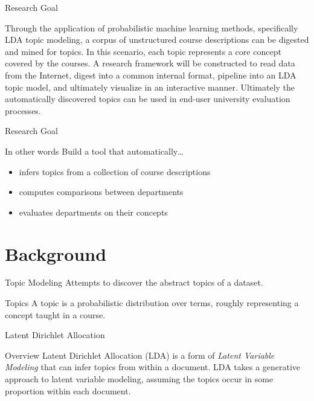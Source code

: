 \documentclass[10pt, compress]{beamer}
\begin{document}
\begin{frame}{Research Goal}

  \vfill
  Through the application of probabilistic machine learning methods,
  specifically LDA topic modeling, a corpus of unstructured course
  descriptions can be digested and mined for topics. In this scenario,
  each topic represents a core concept covered by the courses.
  \vfill
  A research framework will be constructed to read data from the
  Internet, digest into a common internal format, pipeline into an LDA
  topic model, and ultimately visualize in an interactive manner.
  \vfill
  Ultimately the automatically discovered topics can be used in end-user
  university evaluation processes.
  \vfill
\end{frame}


\begin{frame}{Research Goal}

  \begin{block}{In other words}
    Build a tool that automatically\ldots
    \onslide<+->
    \begin{itemize}[<+- | alert@+>]
      \item infers topics from a collection of course descriptions
      \item computes comparisons between departments
      \item evaluates departments on their concepts
    \end{itemize}
  \end{block}

\end{frame}


\section{Background}


\begin{frame}{Topic Modeling}
  Attempts to discover the abstract \alert{topics} of a dataset.

  \begin{block}{Topics}
    A \alert{topic} is a probabilistic distribution over terms, roughly
    representing a concept taught in a course.
  \end{block}
\end{frame}


\begin{frame}{Latent Dirichlet Allocation}
  \begin{block}{Overview}
    \alert{Latent Dirichlet Allocation (LDA)} is a form of \emph{Latent
    Variable Modeling} that can infer topics from within a document.
    \vfill
    LDA takes a generative approach to latent variable modeling, assuming
    the topics occur in some proportion within each document.
  \end{block}
\end{frame}
\end{document}
